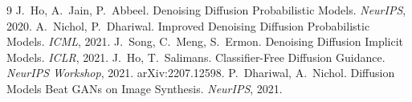 \documentclass[11pt]{article}
\begin{document}
\begin{thebibliography}{9}\small
{} J.~Ho, A.~Jain, P.~Abbeel. Denoising Diffusion Probabilistic Models. \emph{NeurIPS}, 2020.
 A.~Nichol, P.~Dhariwal. Improved Denoising Diffusion Probabilistic Models. \emph{ICML}, 2021.
 J.~Song, C.~Meng, S.~Ermon. Denoising Diffusion Implicit Models. \emph{ICLR}, 2021.
 J.~Ho, T.~Salimans. Classifier-Free Diffusion Guidance. \emph{NeurIPS Workshop}, 2021. arXiv:2207.12598.
 P.~Dhariwal, A.~Nichol. Diffusion Models Beat GANs on Image Synthesis. \emph{NeurIPS}, 2021.
\end{thebibliography}
\end{document}
